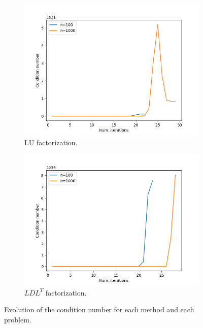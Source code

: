 \documentclass[11pt,a4paper]{article}
\begin{document}
\begin{figure}[H]
  \centering
  \begin{subfigure}[t]{0.5\textwidth}
    \centering
    \includegraphics[scale=0.4]{img/equality_cond_iter_lu}
    \caption{LU factorization.}  
  \end{subfigure}%
  \begin{subfigure}[t]{0.5\textwidth}
    \centering
    \includegraphics[scale=0.4]{img/equality_cond_iter_ldl}
    \caption{$LDL^T$ factorization.}  
  \end{subfigure}
  \caption{Evolution of the condition number for each method and each problem.}
  \label{fig:eq-cond-num}
\end{figure}
\end{document}
